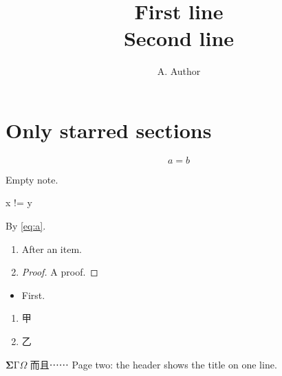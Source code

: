 \documentclass[twocolumn, thmwithin=none, eqwithin=none, codewithin=none,
  header=default, footer=page]{akizumi-note}
\title{First line\\ Second line}
\author{A. Author}
\begin{document}
\maketitle
\section*{Only starred sections}
\begin{equation}\label{eq:a} a = b \end{equation}
\begin{theorem}[]\label{thm:a} Empty note. \end{theorem}
\begin{codeblock}[numbered, label=lst:a]
x != y
\end{codeblock}
\makeatletter
{}
\makeatother
By \cref{eq:a}.
\begin{enumerate}
\item
\begin{theorem} After an item. \end{theorem}
\item \begin{proof} A proof. \end{proof}
\end{enumerate}
\begin{remark*}
\begin{itemize}
\item First.
\end{itemize}
\end{remark*}
\begin{enumerate}[label=\chinese*、]
\item 甲 \item 乙
\end{enumerate}
$\mathbf{\Sigma} \mathrm{\Gamma} \mathsf{\Omega}$ 而且⋯⋯
\clearpage
Page two: the header shows the title on one line.
\end{document}
